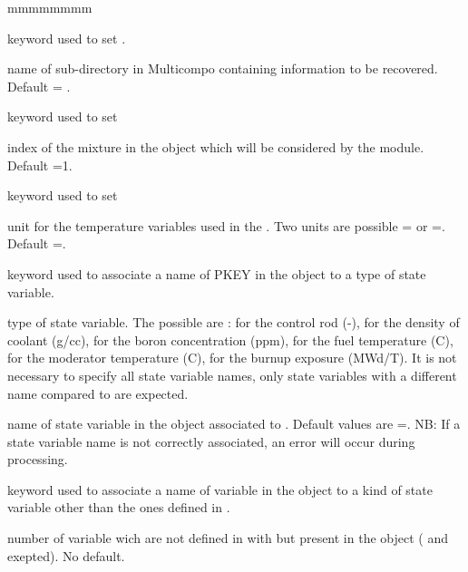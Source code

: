 \begin{ListeDeDescription}{mmmmmmmm}

\item[\moc{NAMDIR}] keyword used to set   .

\item[\dusa{mixdir}] name of sub-directory in Multicompo containing information to be recovered.  Default  = .

\item[\moc{MIX}]keyword used to set 

\item[\dusa{imix}] index of the mixture in the  object which will be considered by the module. Default =1.

\item[\moc{TEMP}] keyword used to set 

\item[\dusa{htemp}] unit for the temperature variables used in the . Two units are possible = or =. Default =.
\item[\moc{PKEY}]  keyword used to associate a name of PKEY in the  object to a type of state variable.

\item[\dusa{refnam}]  type of state variable. The possible  are :   for the control rod (-),  for the density of coolant (g/cc),  for the boron concentration (ppm),   for the fuel temperature (C),  for the moderator temperature (C),   for the burnup exposure (MWd/T). It is not necessary to specify all state variable names, only state variables with a different name compared to  are expected.

\item[\dusa{sapnam}]  name of state variable in the  object associated to  . Default values are =. 
NB: If a state variable name is not correctly associated, an error will occur during processing.

\item[\moc{OTHER}]  keyword used to associate a name of variable in the  object to a kind of state variable other than the ones defined in .

\item[\dusa{noth}]  number of variable wich are not defined in with  but present in the  object ( and  exepted). No default.


\end{ListeDeDescription}
